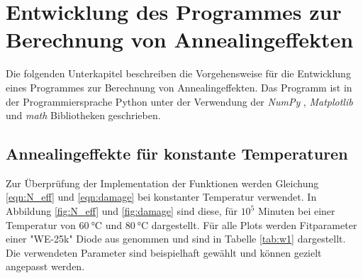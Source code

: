 \chapter{Entwicklung des Programmes zur Berechnung von Annealingeffekten}\label{make}
Die folgenden Unterkapitel beschreiben die Vorgehensweise für die Entwicklung  eines Programmes zur
Berechnung von Annealingeffekten. Das Programm ist in der Programmiersprache Python unter
der Verwendung der \textit{NumPy} \cite{oliphant2006guide}, \textit{Matplotlib} \cite{Hunter:2007} und \textit{math} Bibliotheken geschrieben.
\section{Annealingeffekte für konstante Temperaturen}
Zur Überprüfung der Implementation der Funktionen werden
Gleichung \ref{eqn:N_eff} und \ref{eqn:damage}  bei konstanter Temperatur verwendet. In
Abbildung \ref{fig:N_eff} und \ref{fig:damage} sind diese, für $10^5$ Minuten bei einer Temperatur
von $\SI{60}{\celsius}$ und $\SI{80}{\celsius}$  dargestellt.
Für alle Plots werden Fitparameter
einer "WE-25k" Diode aus \cite{moll} genommen und sind in Tabelle \ref{tab:w1} dargestellt. Die verwendeten
Parameter sind beispielhaft gewählt und können gezielt angepasst werden.


